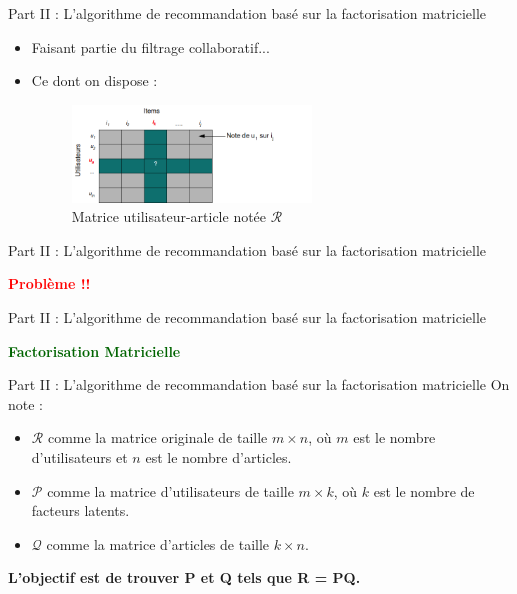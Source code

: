 \newcommand{\PartII}{Part II : L'algorithme de recommandation basé sur la factorisation matricielle}

\begin{frame}{\PartII}
\begin{itemize}
	\item Faisant partie du filtrage collaboratif...
	\item {
		Ce dont on dispose :
		\begin{figure}[htbp]
			\centering
			\hspace{80pt}
			\includegraphics[width=0.6\textwidth]{ressources/matrix_users_items.png}
			\caption{Matrice utilisateur-article notée $\mathcal{R}$}
			\label{fig:matrix-user-article}
		\end{figure}
	}
\end{itemize}
\end{frame}

\begin{frame}{\PartII}
\begin{center}
	\textcolor{red}{\textbf{\large{Problème !!}}}
\end{center}
\end{frame}

\begin{frame}{\PartII}
	\begin{center}
		\textcolor{darkgreen}{\textbf{\large{Factorisation Matricielle}}}
	\end{center}
\end{frame}

\begin{frame}{\PartII}
	On note :
	\begin{itemize}
		\item $\mathcal{R}$ comme la matrice originale de taille $m \times n$, où $m$ est le nombre d'utilisateurs et $n$ est le nombre d'articles.
		\item $\mathcal{P}$ comme la matrice d'utilisateurs de taille $m \times k$, où $k$ est le nombre de facteurs latents.
		\item $\mathcal{Q}$ comme la matrice d'articles de taille $k \times n$.
	\end{itemize}
	\begin{center}
				\textbf{L'objectif est de trouver P et Q tels que R = PQ.}
	\end{center}
\end{frame}

